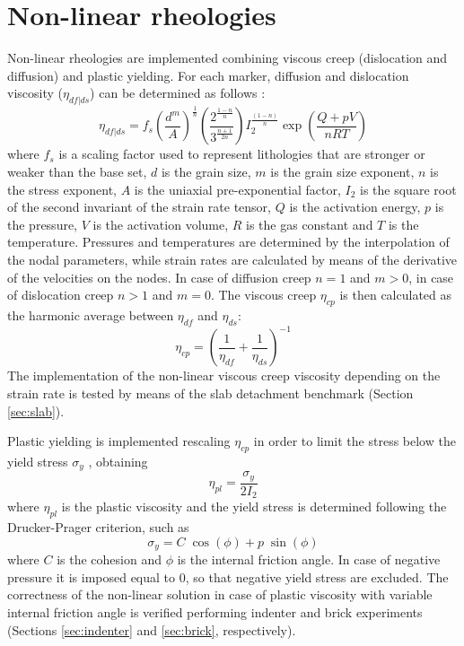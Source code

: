 \documentclass[hidelinks,10pt,a4paper]{article}
\begin{document}
\section{Non-linear rheologies}\label{sec:nonlinear}
Non-linear rheologies are implemented combining viscous creep (dislocation and diffusion) and plastic yielding. For each marker, diffusion and dislocation
viscosity ($\eta_{df|ds}$) can be determined as follows \citep{Karato1993,Wang2016}:
\begin{equation}\label{eq:viscous}
\eta_{df|ds}=f_s \left(\frac{d^m}{A}\right)^{\frac{1}{n}} \left (\frac{2^{\frac{1-n}{n}}}{3^{\frac{n+1}{2n}}} \right)
I_2^{\frac{(1-n)}{n}}\exp\left(\frac{Q+pV}{nRT}\right)
\end{equation}
where $f_s$ is a scaling factor used to represent lithologies that are stronger or weaker than the base set, $d$ is the grain size, $m$ is the grain size exponent,
$n$ is the stress exponent, $A$ is the uniaxial pre-exponential factor, $I_2$ is the square root of the second invariant of the strain rate tensor, $Q$ is the
activation energy, $p$ is the pressure, $V$ is the activation volume, $R$ is the gas constant and $T$ is the temperature.
Pressures and temperatures are determined by the interpolation of the nodal parameters, while strain rates are calculated by means of the
derivative of the velocities on the nodes. In case of diffusion creep $n=1$ and $m>0$, in case of dislocation creep $n>1$ and $m=0$. The viscous creep $\eta_{cp}$
is then calculated as the harmonic average between $\eta_{df}$ and $\eta_{ds}$:
\begin{equation}\label{eq:visco_creep}
\eta_{cp}=\left(\frac{1}{\eta_{df}}+\frac{1}{\eta_{ds}}\right)^{-1}
\end{equation}
The implementation of the non-linear viscous creep viscosity depending on the strain rate is tested by means of the slab detachment benchmark
(Section \ref{sec:slab}).

Plastic yielding is implemented rescaling $\eta_{cp}$ in order to limit the stress below the yield stress $\sigma_y$ \citep{Thieulot2008,Thieulot2014,Glerum2018},
obtaining
\begin{equation}\label{eq:plastic}
\eta_{pl}=\frac{\sigma_y}{2I_2}
\end{equation}
where $\eta_{pl}$ is the plastic viscosity and the yield stress is determined following the Drucker-Prager criterion, such as
\begin{equation}\label{eq:yield}
\sigma_y=C\;\cos(\phi)+p\;\sin(\phi)
\end{equation}
where $C$ is the cohesion and $\phi$ is the internal friction angle. In case of negative pressure it is imposed equal to 0, so that negative yield stress are
excluded. The correctness of the non-linear solution in case of plastic viscosity with variable internal friction angle is verified performing indenter and
brick experiments (Sections \ref{sec:indenter} and \ref{sec:brick}, respectively).
\end{document}
